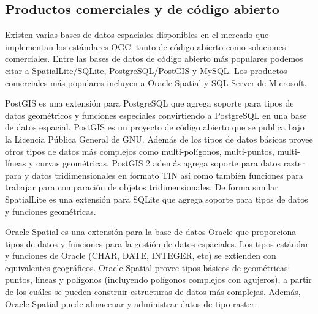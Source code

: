 \subsection{Productos comerciales y de código abierto}

Existen varias bases de datos espaciales disponibles en el mercado que implementan los estándares OGC, tanto de código abierto como soluciones comerciales. Entre las bases de datos de código abierto más populares podemos citar a SpatialLite/SQLite, PostgreSQL/PostGIS y MySQL. Los productos comerciales más populares incluyen a Oracle Spatial y SQL Server de Microsoft.

PostGIS es una extensión para PostgreSQL que agrega soporte para tipos de datos geométricos y funciones especiales convirtiendo a PostgreSQL en una base de datos espacial. PostGIS es un proyecto de código abierto que se publica bajo la Licencia Pública General de GNU. Además de los tipos de datos básicos provee otros tipos de datos más complejos como multi-polígonos, multi-puntos, multi-líneas y curvas geométricas. PostGIS 2 además agrega soporte para datos raster para  y datos tridimensionales en formato TIN así como también funciones para trabajar para comparación de objetos tridimensionales. De forma similar SpatialLite es una extensión para SQLite que agrega soporte para tipos de datos y funciones geométricas.

Oracle Spatial es una extensión para la base de datos Oracle que proporciona tipos de datos y funciones para la gestión de datos espaciales. Los tipos estándar y funciones de Oracle (CHAR, DATE, INTEGER, etc) se extienden con equivalentes geográficos. Oracle Spatial provee tipos básicos de geométricas: puntos, líneas y polígonos (incluyendo polígonos complejos con agujeros), a partir de los cuáles se pueden construir estructuras de datos más complejas. Además, Oracle Spatial puede almacenar y administrar datos de tipo raster.
